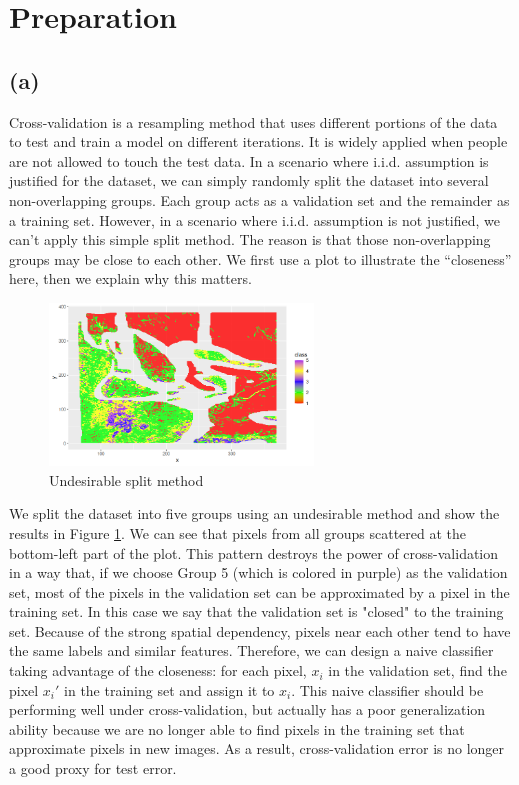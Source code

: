 \documentclass[11pt]{article}
\theoremstyle{definition}
\begin{document}
\section{Preparation}
\subsection*{(a)}
Cross-validation is a resampling method that uses different portions of the data to test and train a model on different iterations. It is widely applied when people are not allowed to touch the test data. In a scenario where i.i.d. assumption is justified for the dataset, we can simply randomly split the dataset into several non-overlapping groups. Each group acts as a validation set and the remainder as a training set. However, in a scenario where i.i.d. assumption is not justified, we can't apply this simple split method. The reason is that those non-overlapping groups may be close to each other. We first use a plot to illustrate the ``closeness'' here, then we explain why this matters.
\begin{figure}[h]
\small
\centering
\includegraphics[width=7cm]{figures/2a1.png}
\caption{Undesirable split method}
\label{2a1}
\end{figure}
\FloatBarrier

We split the dataset into five groups using an undesirable method and show the results in Figure \ref{2a1}. We can see that pixels from all groups scattered at the bottom-left part of the plot. This pattern destroys the power of cross-validation in a way that, if we choose Group 5 (which is colored in purple) as the validation set, most of the pixels in the validation set can be approximated by a pixel in the training set. In this case we say that the validation set is "closed" to the training set. Because of the strong spatial dependency, pixels near each other tend to have the same labels and similar features. Therefore, we can design a naive classifier taking advantage of the closeness: for each pixel, $x_i$ in the validation set, find the pixel $x_i'$ in the training set and assign it to $x_i$. This naive classifier should be performing well under cross-validation, but actually has a poor generalization ability because we are no longer able to find pixels in the training set that approximate pixels in new images. As a result, cross-validation error is no longer a good proxy for test error. 
\end{document}
